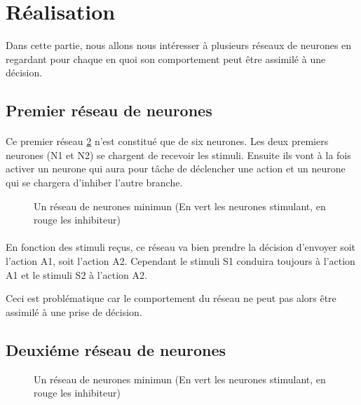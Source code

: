 \section{Réalisation}
Dans cette partie, nous allons nous intéresser à plusieurs réseaux de neurones
en regardant pour chaque en quoi son comportement peut être assimilé à une 
décision.


\subsection{Premier réseau de neurones}
\paragraph{}
Ce premier réseau \ref{reseau1} n'est constitué que de six neurones. Les deux
premiers neurones (N1 et N2) se chargent de recevoir les stimuli. Ensuite ils 
vont à la fois activer un neurone qui aura pour tâche de déclencher une 
action et un neurone qui se chargera d'inhiber l'autre branche. 

\begin{figure}[!h]
  \begin{center}
    
  \end{center}
  \caption{Un réseau de neurones minimun (En vert les neurones stimulant, en rouge les inhibiteur)}
  \label{reseau1}
\end{figure}

\paragraph{}
En fonction des stimuli reçus, ce réseau va bien prendre la décision 
d'envoyer soit l'action A1, soit l'action A2. Cependant le 
stimuli S1 conduira toujours à l'action A1 et le stimuli S2 à 
l'action A2.

Ceci est problématique car le comportement du réseau ne peut pas 
alors être assimilé à une prise de décision.

\subsection{Deuxiéme réseau de neurones}

\begin{figure}[!h]
  \begin{center}
    
  \end{center}
  \caption{Un réseau de neurones minimun (En vert les neurones stimulant, en rouge les inhibiteur)}
  \label{reseau1}
\end{figure}


